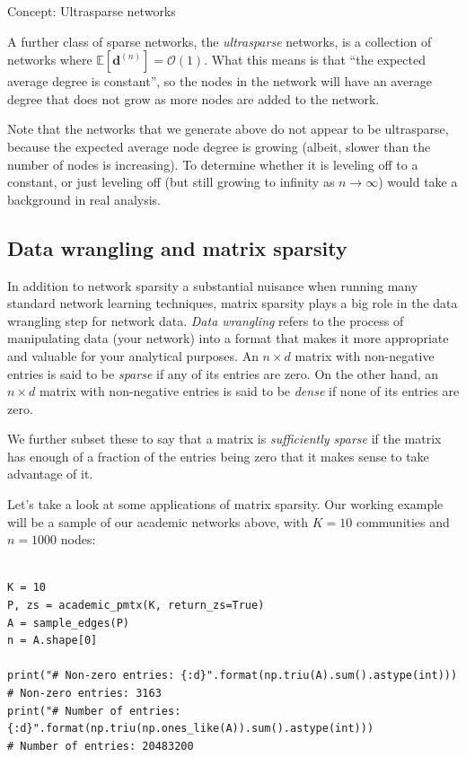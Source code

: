 \begin{floatingbox}[h]\caption{Concept: Ultrasparse networks}
A further class of sparse networks, the \textit{ultrasparse} networks, is a collection of networks where $\mathbb E[\mathbf d^{(n)}]= \mathcal O(1)$. What this means is that ``the expected average degree is constant'', so the nodes in the network will have an average degree that does not grow as more nodes are added to the network. 

Note that the networks that we generate above do not appear to be ultrasparse, because the expected average node degree is growing (albeit, slower than the number of nodes is increasing). To determine whether it is leveling off to a constant, or just leveling off (but still growing to infinity as $n \rightarrow \infty$) would take a background in real analysis.
\end{floatingbox}

\subsection{Data wrangling and matrix sparsity}

In addition to network sparsity a substantial nuisance when running many standard network learning techniques, matrix sparsity plays a big role in the data wrangling step for network data. \textit{Data wrangling} refers to the process of manipulating data (your network) into a format that makes it more appropriate and valuable for your analytical purposes. An $n \times d$ matrix with non-negative entries is said to be \textit{sparse} if any of its entries are zero. On the other hand, an $n \times d$ matrix with non-negative entries is said to be \textit{dense} if none of its entries are zero.

We further subset these to say that a matrix is \textit{sufficiently sparse} if the matrix has enough of a fraction of the entries being zero that it makes sense to take advantage of it.

Let's take a look at some applications of matrix sparsity. Our working example will be a sample of our academic networks above, with $K = 10$ communities and $n=1000$ nodes:

\begin{lstlisting}[style=python]

K = 10
P, zs = academic_pmtx(K, return_zs=True)
A = sample_edges(P)
n = A.shape[0]

print("# Non-zero entries: {:d}".format(np.triu(A).sum().astype(int)))
# Non-zero entries: 3163
print("# Number of entries: {:d}".format(np.triu(np.ones_like(A)).sum().astype(int)))
# Number of entries: 20483200
\end{lstlisting}

